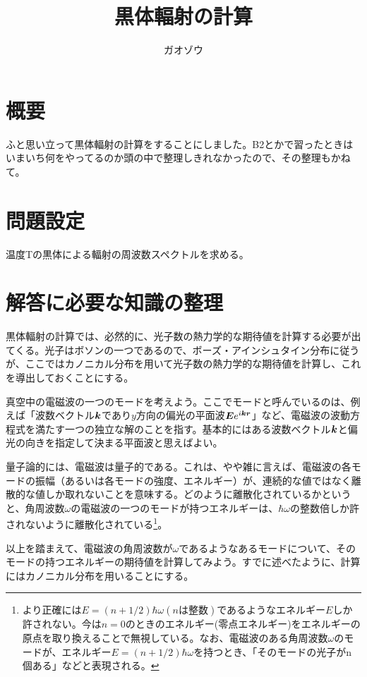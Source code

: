 \documentclass[uplatex,dvipdfmx]{jsarticle}
\title{黒体輻射の計算}
\author{ガオゾウ}
\begin{document}
\maketitle
\section{概要}
ふと思い立って黒体輻射の計算をすることにしました。B2とかで習ったときはいまいち何をやってるのか頭の中で整理しきれなかったので、その整理もかねて。

\section{問題設定}
温度Tの黒体による輻射の周波数スペクトルを求める。

\section{解答に必要な知識の整理} \label{sec:knowledge}
黒体輻射の計算では、必然的に、光子数の熱力学的な期待値を計算する必要が出てくる。光子はボソンの一つであるので、ボーズ・アインシュタイン分布に従うが、ここではカノニカル分布を用いて光子数の熱力学的な期待値を計算し、これを導出しておくことにする。

\vspace{0.5cm}

真空中の電磁波の一つのモードを考えよう。ここでモードと呼んでいるのは、例えば「波数ベクトル$\vb*{k}$であり$y$方向の偏光の平面波$\vb*{E}e^{i\vb*{kr}}$」など、電磁波の波動方程式を満たす一つの独立な解のことを指す。基本的にはある波数ベクトル$\vb*{k}$と偏光の向きを指定して決まる平面波と思えばよい。

量子論的には、電磁波は量子的である。これは、やや雑に言えば、電磁波の各モードの振幅（あるいは各モードの強度、エネルギー）が、連続的な値ではなく離散的な値しか取れないことを意味する。どのように離散化されているかというと、角周波数$\omega$の電磁波の一つのモードが持つエネルギーは、$\hbar \omega$の整数倍しか許されないように離散化されている\footnote{より正確には$E=(n+1/2)\hbar\omega(nは整数)$であるようなエネルギー$E$しか許されない。今は$n=0$のときのエネルギー(零点エネルギー)をエネルギーの原点を取り換えることで無視している。なお、電磁波のある角周波数$\omega$のモードが、エネルギー$E=(n+1/2)\hbar\omega$を持つとき、「そのモードの光子がn個ある」などと表現される。}。

以上を踏まえて、電磁波の角周波数が$\omega$であるようなあるモードについて、そのモードの持つエネルギーの期待値を計算してみよう。すでに述べたように、計算にはカノニカル分布を用いることにする。
\end{document}
